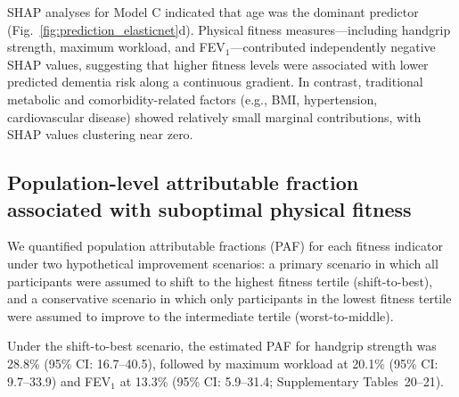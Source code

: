 \documentclass{article}
\begin{document}

SHAP analyses for Model C indicated that age was the dominant predictor (Fig.~\ref{fig:prediction_elasticnet}d).
Physical fitness measures—including handgrip strength, maximum workload, and FEV$_1$—contributed independently negative SHAP values, suggesting that higher fitness levels were associated with lower predicted dementia risk along a continuous gradient.
In contrast, traditional metabolic and comorbidity-related factors (e.g., BMI, hypertension, cardiovascular disease) showed relatively small marginal contributions, with SHAP values clustering near zero.


\subsection*{Population-level attributable fraction associated with 
suboptimal physical fitness}

We quantified population attributable fractions (PAF) for each fitness 
indicator under two hypothetical improvement scenarios: a primary 
scenario in which all participants were assumed to shift to the highest 
fitness tertile (shift-to-best), and a conservative scenario in which 
only participants in the lowest fitness tertile were assumed to improve 
to the intermediate tertile (worst-to-middle).

Under the shift-to-best scenario, the estimated PAF for handgrip strength 
was 28.8\% (95\% CI: 16.7--40.5), followed by maximum workload at 20.1\% 
(95\% CI: 9.7--33.9) and FEV$_1$ at 13.3\% (95\% CI: 
5.9--31.4; Supplementary Tables~20--21).
\end{document}
